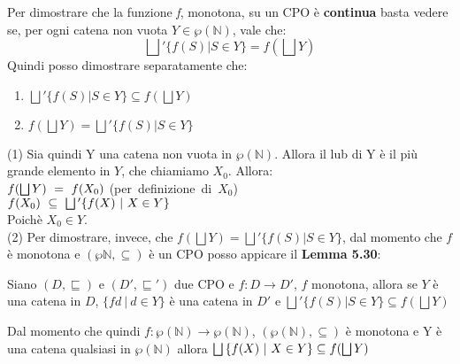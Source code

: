 {    Per dimostrare che la funzione \textit{f}, monotona, su un CPO è 
    \textbf{continua} basta vedere se, per ogni catena non vuota 
    $Y\in\wp{(\mathbb{N})}$, vale che:
    \[\bigsqcup{}' \{f(S) | S \in{}Y\} = f(\bigsqcup{}Y)\]
    Quindi posso dimostrare separatamente che:
    \begin{enumerate}
    \item $\bigsqcup{}' \{f(S) | S \in{}Y\} \subseteq f(\bigsqcup{}Y)$
    \item $f(\bigsqcup{}Y) = \bigsqcup{}' \{f(S) | S \in{}Y\}$
    \end{enumerate}
    (1) Sia quindi Y una catena non vuota in $\wp{(\mathbb{N})}$. Allora il lub
    di Y è il più grande elemento in $Y$, che chiamiamo $X_0$. Allora:\\
    \hspace*{1.5cm}$f(\bigsqcup{}Y)~=~f(X_0)$ (per~definizione~di~$X_0$)\\
    \hspace*{1.5cm}$f(X_0)~\subseteq~\bigsqcup{}'\{f(X)~|~X\in{}Y\}$ \\
    Poichè $X_0\in{}Y$.\\
    (2) Per dimostrare, invece, che $f(\bigsqcup{}Y) = 
    \bigsqcup{}' \{f(S) | S \in{}Y\}$, dal momento che $f$ è monotona e 
    $(\wp{\mathbb{N}}, \subseteq{})$ è un CPO posso appicare il \textbf{Lemma 5.30}:\\
    \begin{customlem}{5.30}
    Siano $(D, \sqsubseteq)$ e $(D', \sqsubseteq{}')$ due CPO e 
    $f:D\rightarrow{}D'$, $f$ monotona, allora se $Y$ è una catena in $D$, 
    $\{fd~|~d\in{}Y\}$ è una catena in $D'$ e $\bigsqcup{}' \{f(S) | S \in{}Y\} 
    \subseteq f(\bigsqcup{}Y)$
    \end{customlem}
    Dal momento che quindi $f:\wp{(\mathbb{N})}\rightarrow{}\wp{(\mathbb{N})}$,
    $(\wp{(\mathbb{N})}, \subseteq)$ è monotona e Y è una catena qualsiasi in 
    $\wp{(\mathbb{N})}$ allora $\bigsqcup{}\{f(X)~|~X\in{}Y\}\subseteq{}f(\bigsqcup{}Y)$
%
	
}
\newpage